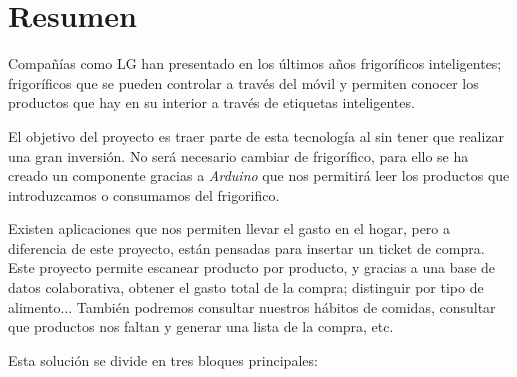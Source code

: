 \chapter*{Resumen}

Compañías como LG han presentado en los últimos años frigoríficos inteligentes; frigoríficos que se pueden controlar a través del móvil y permiten conocer los productos que hay en su interior a través de etiquetas inteligentes. 

El objetivo del proyecto es traer parte de esta tecnología al sin tener que realizar una gran inversión. No será necesario cambiar de frigorífico, para ello se ha creado un componente gracias a \emph{Arduino} que nos permitirá leer los productos que introduzcamos o consumamos del frigorifico.

Existen aplicaciones que nos permiten llevar el gasto en el hogar, pero a diferencia de este proyecto, están pensadas para insertar un ticket de compra. Este proyecto permite escanear producto por producto, y gracias a una base de datos colaborativa, obtener el gasto total de la compra; distinguir por tipo de alimento... También podremos consultar nuestros hábitos de comidas, consultar que productos nos faltan y generar una lista de la compra, etc. 

Esta solución se divide en tres bloques principales:

